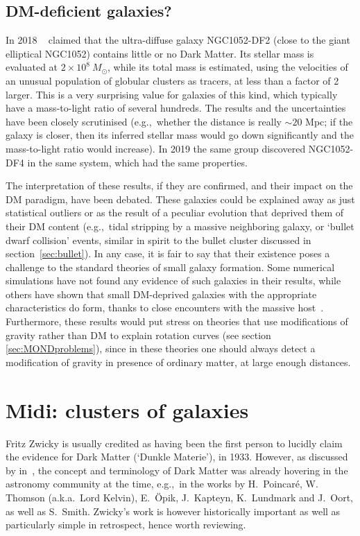  
 \subsection{DM-deficient galaxies?}\label{sec:DMdeficient}
In 2018  ~\cite{DMdeficient} claimed that the ultra-diffuse galaxy NGC1052-DF2 
(close to the giant elliptical NGC1052) 
contains little or no Dark Matter. 
Its stellar mass is evaluated at $2 \times 10^{8} \ M_\odot$, while its total mass is estimated, using the velocities of an unusual population of globular clusters as tracers, at less than a factor of 2 larger. This is a very surprising value for galaxies of this kind, which typically have a mass-to-light ratio of several hundreds. 
The results and the uncertainties have been closely scrutinised (e.g.,~whether the distance is really $\sim 20$ Mpc; if the galaxy is closer, then its inferred stellar mass would go down significantly and the mass-to-light ratio would increase). 
In 2019 the same group discovered NGC1052-DF4 in the same system, which had the same properties. 

The interpretation of these results, if they are confirmed, and their impact on the DM paradigm, have been debated. 
These galaxies could be explained away as just statistical outliers or as the result of a peculiar evolution that deprived them of their DM content (e.g.,~tidal stripping by a massive neighboring galaxy, or `bullet dwarf collision' events, similar in spirit to the bullet cluster discussed in section~\ref{sec:bullet}). 
In any case, it is fair to say that their existence poses a challenge to the standard theories of small galaxy formation. Some numerical simulations have not found any evidence of such galaxies in their results, while others have shown that small DM-deprived galaxies with the appropriate characteristics do form, thanks to close encounters with the massive host~\cite{DMdeficient}. 
Furthermore, these results would put stress on theories that use modifications of gravity rather than DM to explain rotation curves (see section \ref{sec:MONDproblems}), since in these theories one should always detect a modification of gravity in presence of ordinary matter, at large enough distances.




\section{Midi: clusters of galaxies}
\label{sec:evidencesmedi}
Fritz Zwicky is usually credited as having been the first person to lucidly claim the evidence for Dark Matter (`Dunkle Materie'), in 1933. 
However, as discussed by  in~\cite{otherpastDMreviews}, 
the concept and terminology of Dark Matter was already hovering in the astronomy community at the time, e.g.,~in the works by H.~Poincar\'e,  W. Thomson (a.k.a.~Lord Kelvin), E.~\"Opik,  J.~Kapteyn, K.~Lundmark and J.~Oort, as well as S.~Smith.
Zwicky's work is however historically important as well as particularly simple in retrospect, hence worth reviewing. 

